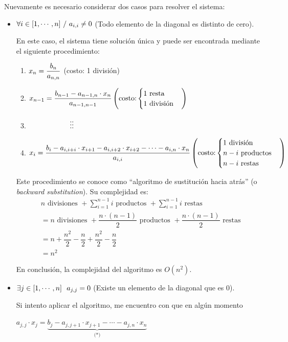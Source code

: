 \documentclass[]{article}
\begin{document}
Nuevamente es necesario considerar dos casos para resolver el sistema:
\begin{itemize}
	\item $\forall i \in [1,\cdots,n]\ /\  a_{i,i}\neq 0$ (Todo elemento de la diagonal es distinto de cero).

	En este caso, el sistema tiene solución única y puede ser encontrada mediante el siguiente procedimiento:
	\begin{enumerate}
		\item $x_n = \displaystyle \frac{b_n}{a_{n,n}} \hfill$ (costo: 1 división)
		\item $x_{n-1} = \displaystyle \frac{b_{n-1} - a_{n-1,n}\cdot x_n}{a_{n-1,n-1}} \hfill \left( \text{costo:} \begin{cases}
			1 \text{ resta}\\
			1 \text{ división}
		\end{cases}\right)$
		\item $\tab \vdots \hfill \vdots \tab \tab \tab \ $
		\item $x_i = \dfrac{b_i-a_{i,i+i}\cdot x_{i+1} - a_{i,i+2}\cdot x_{i+2} - \cdots - a_{i,n}\cdot x_n}{a_{i,i}} \hfill \left(\text{costo:} \begin{cases}
			1 \text{ división}\\
			n-i \text{ productos}\\
			n-i \text{ restas}
		\end{cases}\right)$
	\end{enumerate}

	Este procedimiento se conoce como ``algoritmo de sustitución hacia atrás'' (o \textit{backward substitution}). Su complejidad es:
	\begin{align*}
		&n \text{ divisiones } + \displaystyle \sum_{i=1}^{n-1}i \text{ productos } + \displaystyle \sum_{i=1}^{n-1}i \text{ restas }\\
		&= n \text{ divisiones } + \dfrac{n\cdot (n-1)}{2} \text{ productos } + \dfrac{n\cdot (n-1)}{2} \text{ restas }\\
		&= n + \dfrac{n^2}{2} - \dfrac{n}{2} + \dfrac{n^2}{2} - \dfrac{n}{2}\\
		&=n^2
	\end{align*}

	En conclusión, la complejidad del algoritmo es $O(n^2)$.

	\item $\exists j \in [1,\cdots,n]\ \/ \ a_{j,j}=0$ (Existe un elemento de la diagonal que es 0).

	Si intento aplicar el algoritmo, me encuentro con que en algún momento
	\begin{center}
		$a_{j,j}\cdot x_j = \underbrace{b_j - a_{j,j+1}\cdot x_{j+1} - \cdots - a_{j,n}\cdot x_n}_{\text{ (*) }}$
	\end{center}


\end{itemize}
\end{document}
